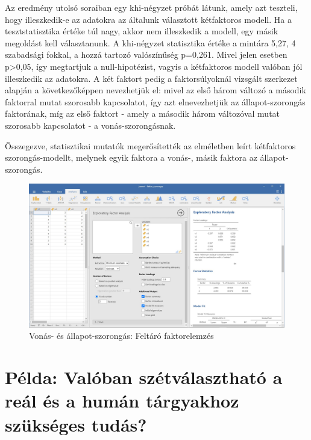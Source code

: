 \documentclass[
  letterpaper,
]{krantz}
\begin{document}
Az eredmény utolsó soraiban egy khi-négyzet próbát látunk, amely azt
teszteli, hogy illeszkedik-e az adatokra az általunk választott
kétfaktoros modell. Ha a tesztstatisztika értéke túl nagy, akkor nem
illeszkedik a modell, egy másik megoldást kell választanunk. A
khi-négyzet statisztika értéke a mintára 5,27, 4 szabadsági fokkal, a
hozzá tartozó valószínűség p=0,261. Mivel jelen esetben
p\textgreater0,05, így megtartjuk a null-hipotézist, vagyis a
kétfaktoros modell valóban jól illeszkedik az adatokra. A két faktort
pedig a faktorsúlyoknál vizsgált szerkezet alapján a következőképpen
nevezhetjük el: mivel az első három változó a második faktorral mutat
szorosabb kapcsolatot, így azt elnevezhetjük az állapot-szorongás
faktorának, míg az első faktort - amely a második három változóval mutat
szorosabb kapcsolatot - a vonás-szorongásnak.

Összegezve, statisztikai mutatók megerősítették az elméletben leírt
kétfaktoros szorongás-modellt, melynek egyik faktora a vonás-, másik
faktora az állapot-szorongás.

\begin{figure}

{\centering \includegraphics{./images/faktor_szorongas_kep_01.jpg}

}

\caption{Vonás- és állapot-szorongás: Feltáró faktorelemzés}

\end{figure}

\hypertarget{puxe9lda-valuxf3ban-szuxe9tvuxe1laszthatuxf3-a-reuxe1l-uxe9s-a-humuxe1n-tuxe1rgyakhoz-szuxfcksuxe9ges-tuduxe1s}{%
\section{Példa: Valóban szétválasztható a reál és a humán tárgyakhoz
szükséges
tudás?}\label{puxe9lda-valuxf3ban-szuxe9tvuxe1laszthatuxf3-a-reuxe1l-uxe9s-a-humuxe1n-tuxe1rgyakhoz-szuxfcksuxe9ges-tuduxe1s}}
\end{document}
